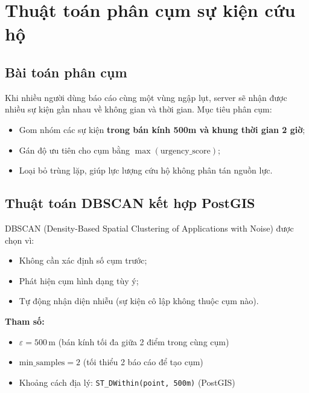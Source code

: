 \documentclass[12pt, a4paper]{report}
\newcommand{\tech}[1]{\texttt{#1}}
\begin{document}
\chapter{Thuật toán phân cụm sự kiện cứu hộ}

\section{Bài toán phân cụm}

Khi nhiều người dùng báo cáo cùng một vùng ngập lụt, server sẽ nhận được nhiều sự kiện gần nhau về không gian và thời gian. Mục tiêu phân cụm:
\begin{itemize}
  \item Gom nhóm các sự kiện \textbf{trong bán kính 500m và khung thời gian 2 giờ};
  \item Gán độ ưu tiên cho cụm bằng $\max(\text{urgency\_score})$;
  \item Loại bỏ trùng lặp, giúp lực lượng cứu hộ không phân tán nguồn lực.
\end{itemize}

\section{Thuật toán DBSCAN kết hợp PostGIS}

DBSCAN (Density-Based Spatial Clustering of Applications with Noise) được chọn vì:
\begin{itemize}
  \item Không cần xác định số cụm trước;
  \item Phát hiện cụm hình dạng tùy ý;
  \item Tự động nhận diện nhiễu (sự kiện cô lập không thuộc cụm nào).
\end{itemize}

\textbf{Tham số:}
\begin{itemize}
  \item $\varepsilon = 500$\,m (bán kính tối đa giữa 2 điểm trong cùng cụm)
  \item $\text{min\_samples} = 2$ (tối thiểu 2 báo cáo để tạo cụm)
  \item Khoảng cách địa lý: \tech{ST\_DWithin(point, 500m)} (PostGIS)
\end{itemize}
\end{document}
